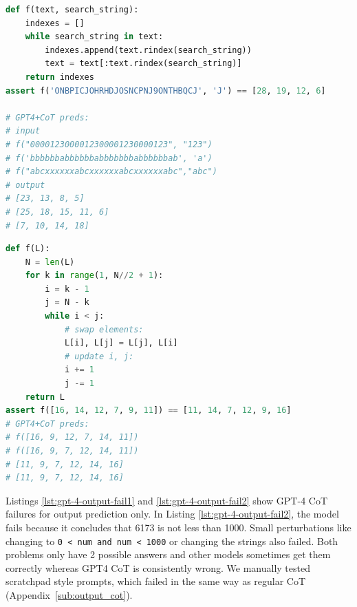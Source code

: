 \begin{minipage}{.48\textwidth} %
\begin{lstlisting}[caption={GPT-4 CoT failures where solutions requires counting to 30}, label={lst:gpt-4-hard1}, breaklines=true, language=python]
def f(text, search_string):
    indexes = []
    while search_string in text:
        indexes.append(text.rindex(search_string))
        text = text[:text.rindex(search_string)]
    return indexes
assert f('ONBPICJOHRHDJOSNCPNJ9ONTHBQCJ', 'J') == [28, 19, 12, 6]

# GPT4+CoT preds:
# input
# f("0000123000012300001230000123", "123")
# f('bbbbbbabbbbbbabbbbbbbabbbbbbab', 'a')
# f("abcxxxxxxabcxxxxxxabcxxxxxxabc","abc")
# output
# [23, 13, 8, 5]
# [25, 18, 15, 11, 6]
# [7, 10, 14, 18]
\end{lstlisting}
\end{minipage}\hfill %
\begin{minipage}{.48\textwidth}
\begin{lstlisting}[caption={GPT-4 CoT failure, cannot easily tell the answer without running the loops}, label={lst:gpt-4-hard2}, breaklines=true, language=python]
def f(L):
    N = len(L)
    for k in range(1, N//2 + 1):
        i = k - 1
        j = N - k
        while i < j:
            # swap elements:
            L[i], L[j] = L[j], L[i]
            # update i, j:
            i += 1
            j -= 1
    return L
assert f([16, 14, 12, 7, 9, 11]) == [11, 14, 7, 12, 9, 16]
# GPT4+CoT preds:
# f([16, 9, 12, 7, 14, 11])
# f([16, 9, 7, 12, 14, 11])
# [11, 9, 7, 12, 14, 16]
# [11, 9, 7, 12, 14, 16]
\end{lstlisting}
\end{minipage}


Listings \ref{lst:gpt-4-output-fail1} and \ref{lst:gpt-4-output-fail2} show GPT-4 CoT failures for output prediction only. In Listing \ref{lst:gpt-4-output-fail2}, the model fails because it concludes that 6173 is not less than 1000. Small perturbations like changing to \texttt{0 < num and num < 1000} or changing the strings also failed. Both problems only have 2 possible answers and other models sometimes get them correctly whereas GPT4 CoT is consistently wrong. We manually tested scratchpad \cite{nye2021show} style prompts, which failed in the same way as regular CoT (Appendix~\ref{sub:output_cot}). 

